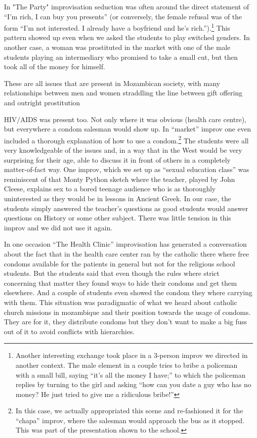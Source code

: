 \documentclass[article,twocolumn,twoside]{memoir}
\begin{document}
In "The Party" improvisation seduction was often around the direct statement of
``I'm rich, I can buy you presents'' (or conversely, the female refusal was of
the form ``I'm not interested. I already have a boyfriend and he's
rich.'').\footnote{Another interesting exchange took place in a 3-person improv
we directed in another context. The male element in a couple tries to bribe a
policeman with a small bill, saying ``it's all the money I have;'' to which the
policeman replies by turning to the girl and asking ``how can you date a guy
who has no money? He just tried to give me a ridiculous bribe!''} This pattern
showed up even when we asked the students to play switched genders. In another
case, a woman was prostituted in the market with one of the male students
playing an intermediary who promised to take a small cut, but then took all of
the money for himself.

These are all issues that are present in Mozambican society, with many
relationships between men and women straddling the line between gift offering
and outright prostitution

HIV/AIDS was present too. Not only where it was obvious (health care centre),
but everywhere a condom salesman would show up. In ``market''
improv one even included a thorough explanation of how to use a condom.\footnote{In
this case, we actually appropriated this scene and re-fashioned it for the
``chapa'' improv, where the salesman would approach the bus as it stopped. This
was part of the presentation shown to the school.} The students were all
very knowledgeable of the issues and, in a way that in the West would be very
surprising for their age, able to discuss it in front of others in a completely
matter-of-fact way. One improv, which we set up as ``sexual education class''
was reminiscent of that Monty Python sketch where the teacher, played by John
Cleese, explains sex to a bored teenage audience who is as thoroughly
uninterested as they would be in lessons in Ancient Greek. In our case, the
students simply answered the teacher's questions as good students would answer
questions on History or some other subject. There was little tension in this
improv and we did not use it again.

In one occasion ``The Health Clinic'' improvisation has generated a conversation
about the fact that in the health care center ran by the catholic there where
free condoms available for the patients in general but not for the religious
school students. But the students said that even though the rules where strict
concerning that matter they found ways to hide their condoms and get them
elsewhere. And a couple of students even showed the condom they where carrying
with them. This situation was paradigmatic of what we heard about catholic
church missions in mozambique and their position towards the usage of condoms.
They are for it, they distribute condoms but they don't want to make a big fuss
out of it to avoid conflicts with hierarchies.
\end{document}

